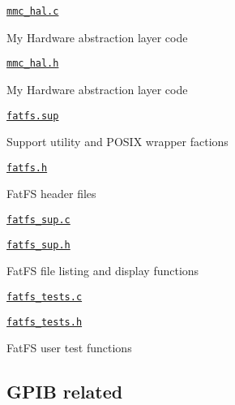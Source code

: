 \begin{DoxyItemize}
\begin{DoxyItemize}
\item \href{fatfs.hal/mmc_hal.c}{\tt mmc\+\_\+hal.\+c}
\begin{DoxyItemize}
\item My Hardware abstraction layer code
\end{DoxyItemize}
\item \href{fatfs.hal/mmc_hal.h}{\tt mmc\+\_\+hal.\+h}
\begin{DoxyItemize}
\item My Hardware abstraction layer code
\end{DoxyItemize}
\end{DoxyItemize}
\item \href{fatfs.sup/fatfs.sup}{\tt fatfs.\+sup}
\begin{DoxyItemize}
\item Support utility and P\+O\+S\+IX wrapper factions
\item \href{fatfs.sup/fatfs.h}{\tt fatfs.\+h}
\begin{DoxyItemize}
\item Fat\+FS header files
\end{DoxyItemize}
\item \href{fatfs.sup/fatfs_sup.c}{\tt fatfs\+\_\+sup.\+c}
\item \href{fatfs.sup/fatfs_sup.h}{\tt fatfs\+\_\+sup.\+h}
\begin{DoxyItemize}
\item Fat\+FS file listing and display functions
\end{DoxyItemize}
\item \href{fatfs.sup/fatfs_tests.c}{\tt fatfs\+\_\+tests.\+c}
\item \href{fatfs.sup/fatfs_tests.h}{\tt fatfs\+\_\+tests.\+h}
\begin{DoxyItemize}
\item Fat\+FS user test functions
\end{DoxyItemize}
\end{DoxyItemize}
\end{DoxyItemize}

\subsection*{G\+P\+IB related}


